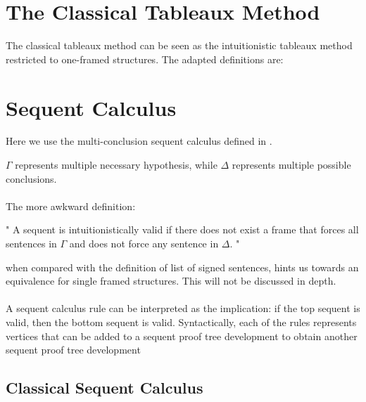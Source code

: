 \documentclass[runningheads]{llncs}
\begin{document}
\section{The Classical Tableaux Method}

The classical tableaux method can be seen as the intuitionistic tableaux method restricted to 
one-framed structures. The adapted definitions are: 


\signedSentenceClassicalDefinition 
\fClassicalDefinition






\section{Sequent Calculus}
    Here we use the multi-conclusion sequent calculus defined in \cite{book2}. 

\sequentDefinition

$\Gamma $ represents multiple necessary hypothesis, while $\Delta$ represents multiple possible conclusions. 
\sequentValidityDefinition
\paragraph{}
The more awkward definition:


"
A sequent is intuitionistically valid if there does not exist a frame 
that forces all sentences in $\Gamma$ and does not force any sentence in $\Delta$.
"

when compared with the definition of list of signed sentences, hints us towards an equivalence for single framed structures. This will not be discussed in depth. 

\paragraph{}
A sequent calculus rule can be interpreted as the implication: if the top sequent is 
 valid, then the bottom sequent is valid. Syntactically, each of the rules represents vertices that can be added to a sequent proof tree development 
to obtain another sequent proof tree development




\subsection {Classical Sequent Calculus}

\developmentSequentClassicalDefinition
\end{document}

